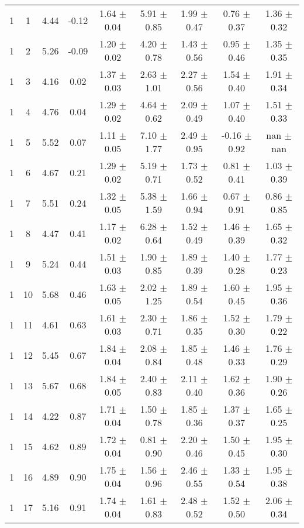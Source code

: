\begin{landscape}
\begin{longtable}{ccccccccc}
 1 &  1 & 4.44 & -0.12 & 1.64 $\pm$ 0.04 & 5.91 $\pm$ 0.85 & 1.99 $\pm$ 0.47 & 0.76 $\pm$ 0.37 & 1.36 $\pm$ 0.32\\
 1 &  2 & 5.26 & -0.09 & 1.20 $\pm$ 0.02 & 4.20 $\pm$ 0.78 & 1.43 $\pm$ 0.56 & 0.95 $\pm$ 0.46 & 1.35 $\pm$ 0.35\\
   1 &  3 & 4.16 & 0.02 & 1.37 $\pm$ 0.03 & 2.63 $\pm$ 1.01 & 2.27 $\pm$ 0.56 & 1.54 $\pm$ 0.40 & 1.91 $\pm$ 0.34\\
   1 &  4 & 4.76 & 0.04 & 1.29 $\pm$ 0.02 & 4.64 $\pm$ 0.62 & 2.09 $\pm$ 0.49 & 1.07 $\pm$ 0.40 & 1.51 $\pm$ 0.33\\
   1 &  5 & 5.52 & 0.07 & 1.11 $\pm$ 0.05 & 7.10 $\pm$ 1.77 & 2.49 $\pm$ 0.95 & -0.16 $\pm$ 0.92 &  nan $\pm$  nan\\
   1 &  6 & 4.67 & 0.21 & 1.29 $\pm$ 0.02 & 5.19 $\pm$ 0.71 & 1.73 $\pm$ 0.52 & 0.81 $\pm$ 0.41 & 1.03 $\pm$ 0.39\\
   1 &  7 & 5.51 & 0.24 & 1.32 $\pm$ 0.05 & 5.38 $\pm$ 1.59 & 1.66 $\pm$ 0.94 & 0.67 $\pm$ 0.91 & 0.86 $\pm$ 0.85\\
   1 &  8 & 4.47 & 0.41 & 1.17 $\pm$ 0.02 & 6.28 $\pm$ 0.64 & 1.52 $\pm$ 0.49 & 1.46 $\pm$ 0.39 & 1.65 $\pm$ 0.32\\
   1 &  9 & 5.24 & 0.44 & 1.51 $\pm$ 0.03 & 1.90 $\pm$ 0.85 & 1.89 $\pm$ 0.39 & 1.40 $\pm$ 0.28 & 1.77 $\pm$ 0.23\\
   1 & 10 & 5.68 & 0.46 & 1.63 $\pm$ 0.05 & 2.02 $\pm$ 1.25 & 1.89 $\pm$ 0.54 & 1.60 $\pm$ 0.45 & 1.95 $\pm$ 0.36\\
   1 & 11 & 4.61 & 0.63 & 1.61 $\pm$ 0.03 & 2.30 $\pm$ 0.71 & 1.86 $\pm$ 0.35 & 1.52 $\pm$ 0.30 & 1.79 $\pm$ 0.22\\
   1 & 12 & 5.45 & 0.67 & 1.84 $\pm$ 0.04 & 2.08 $\pm$ 0.84 & 1.85 $\pm$ 0.48 & 1.46 $\pm$ 0.33 & 1.76 $\pm$ 0.29\\
   1 & 13 & 5.67 & 0.68 & 1.84 $\pm$ 0.05 & 2.40 $\pm$ 0.83 & 2.11 $\pm$ 0.40 & 1.62 $\pm$ 0.36 & 1.90 $\pm$ 0.26\\
   1 & 14 & 4.22 & 0.87 & 1.71 $\pm$ 0.04 & 1.50 $\pm$ 0.78 & 1.85 $\pm$ 0.36 & 1.37 $\pm$ 0.37 & 1.65 $\pm$ 0.25\\
   1 & 15 & 4.62 & 0.89 & 1.72 $\pm$ 0.04 & 0.81 $\pm$ 0.90 & 2.20 $\pm$ 0.46 & 1.50 $\pm$ 0.45 & 1.95 $\pm$ 0.30\\
   1 & 16 & 4.89 & 0.90 & 1.75 $\pm$ 0.04 & 1.56 $\pm$ 0.96 & 2.46 $\pm$ 0.55 & 1.33 $\pm$ 0.54 & 1.95 $\pm$ 0.38\\
   1 & 17 & 5.16 & 0.91 & 1.74 $\pm$ 0.04 & 1.61 $\pm$ 0.83 & 2.48 $\pm$ 0.52 & 1.52 $\pm$ 0.50 & 2.06 $\pm$ 0.34\\

\end{longtable}
\end{landscape}
